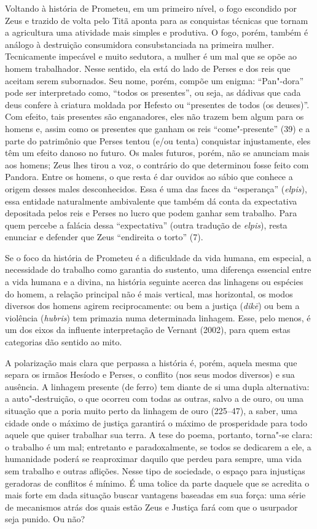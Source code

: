 Voltando à história de Prometeu, em um primeiro nível, o fogo escondido
por Zeus e trazido de volta pelo Titã aponta para as conquistas técnicas
que tornam a agricultura uma atividade mais simples e produtiva. O fogo,
porém, também é análogo à destruição consumidora consubstanciada na
primeira mulher. Tecnicamente impecável e muito sedutora, a mulher é um
mal que se opõe ao homem trabalhador. Nesse sentido, ela está do lado de
Perses e dos reis que aceitam serem subornados. Seu nome, porém, compõe
um enigma: ``Pan"-dora'' pode ser interpretado como, ``todos os
presentes'', ou seja, as dádivas que cada deus confere à criatura
moldada por Hefesto ou ``presentes de todos (os deuses)''. Com efeito,
tais presentes são enganadores, eles não trazem bem algum para os homens
e, assim como os presentes que ganham os reis ``come"-presente'' (39) e a
parte do patrimônio que Perses tentou (e/ou tenta) conquistar
injustamente, eles têm um efeito danoso no futuro. Os males futuros,
porém, não se anunciam mais aos homens; Zeus lhes tirou a voz, o
contrário do que determinou fosse feito com Pandora. Entre os homens, o
que resta é dar ouvidos ao sábio que conhece a origem desses males
desconhecidos. Essa é uma das faces da ``esperança'' (\emph{elpis}),
essa entidade naturalmente ambivalente que também dá conta da
expectativa depositada pelos reis e Perses no lucro que podem ganhar sem
trabalho. Para quem percebe a falácia dessa ``expectativa'' (outra
tradução de \emph{elpis}), resta enunciar e defender que Zeus
``endireita o torto'' (7).

Se o foco da história de Prometeu é a dificuldade da vida humana, em
especial, a necessidade do trabalho como garantia do sustento, uma
diferença essencial entre a vida humana e a divina, na história seguinte
acerca das linhagens ou espécies do homem, a relação principal não é
mais vertical, mas horizontal, os modos diversos dos homens agirem
reciprocamente: ou bem a justiça (\emph{dikē}) ou bem a violência
(\emph{hubris}) tem primazia numa determinada linhagem. Esse, pelo
menos, é um dos eixos da influente interpretação de Vernant (2002), para
quem estas categorias dão sentido ao mito.

A polarização mais clara que perpassa a história é, porém, aquela mesma
que separa os irmãos Hesíodo e Perses, o conflito (nos seus modos
diversos) e sua ausência. A linhagem presente (de ferro) tem diante de
si uma dupla alternativa: a auto"-destruição, o que ocorreu com todas as
outras, salvo a de ouro, ou uma situação que a poria muito perto da
linhagem de ouro (225--47), a saber, uma cidade onde o máximo de justiça
garantirá o máximo de prosperidade para todo aquele que quiser trabalhar
sua terra. A tese do poema, portanto, torna"-se clara: o trabalho é um
mal; entretanto e paradoxalmente, se todos se dedicarem a ele, a
humanidade poderá se reaproximar daquilo que perdeu para sempre, uma
vida sem trabalho e outras aflições. Nesse tipo de sociedade, o espaço
para injustiças geradoras de conflitos é mínimo. É uma tolice da parte
daquele que se acredita o mais forte em dada situação buscar vantagens
baseadas em sua força: uma série de mecanismos atrás dos quais estão
Zeus e Justiça fará com que o usurpador seja punido. Ou não?

